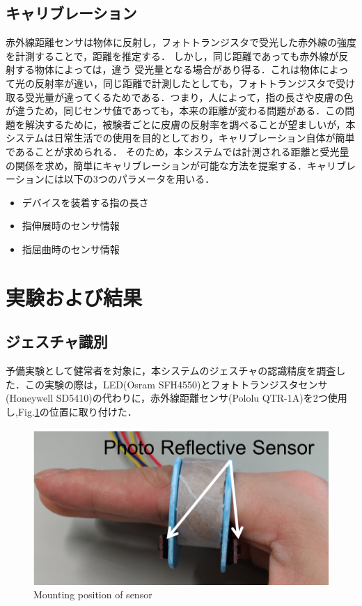 \documentclass{jarticle}
\begin{document}
\subsection{キャリブレーション}
赤外線距離センサは物体に反射し，フォトトランジスタで受光した赤外線の強度を計測することで，距離を推定する．
しかし，同じ距離であっても赤外線が反射する物体によっては，違う
受光量となる場合があり得る．これは物体によって光の反射率が違い，同じ距離で計測したとしても，フォトトランジスタで受け取る受光量が違ってくるためである．つまり，人によって，指の長さや皮膚の色が違うため，同じセンサ値であっても，本来の距離が変わる問題がある．この問題を解決するために，被験者ごとに皮膚の反射率を調べることが望ましいが，本システムは日常生活での使用を目的としており，キャリブレーション自体が簡単であることが求められる．
そのため，本システムでは計測される距離と受光量の関係を求め，簡単にキャリブレーションが可能な方法を提案する．キャリブレーションには以下の3つのパラメータを用いる．

\begin{itemize}
 \item デバイスを装着する指の長さ
 \item 指伸展時のセンサ情報
 \item 指屈曲時のセンサ情報
\end{itemize}


\section{実験および結果}
\subsection{ジェスチャ識別}
予備実験として健常者を対象に，本システムのジェスチャの認識精度を調査した．この実験の際は，LED(Osram SFH4550)とフォトトランジスタセンサ(Honeywell SD5410)の代わりに，赤外線距離センサ(Pololu QTR-1A)を2つ使用し,Fig.\ref{fig:sensor}の位置に取り付けた．

\begin{figure}[h]
  \centering
  \includegraphics[width=0.8\linewidth]{fig/sensor}
  \caption{Mounting position of sensor}
  \label{fig:sensor}
\end{figure}
\end{document}
